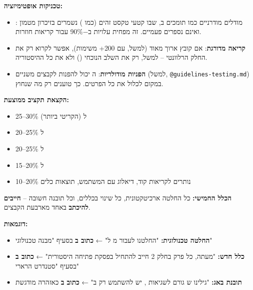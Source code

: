 \textbf{טכניקות אופטימיזציה:}
\begin{itemize}
  \item \textbf{}: מודלים מודרניים כמו  תומכים ב, שבו קטעי טקסט זהים (כמו ) נשמרים בזיכרון מטמון ואינם נספרים פעמיים. זה מפחית עלויות ב\num{-90}\% עבור קריאות חוזרות.
  \item \textbf{קריאה מדורגת}: אם קובץ ארוך מאוד (למשל,  עם \num{200}+ משימות), אפשר לקרוא רק את החלק הרלוונטי – למשל, רק את השלב הנוכחי () ולא את כל ההיסטוריה.
  \item \textbf{הפניות מודולריות}: ה יכול להפנות לקבצים משניים (למשל, \texttt{@guidelines-testing.md}) במקום לכלול את כל הפרטים. כך טוענים רק מה שנחוץ.
\end{itemize}

\textbf{הקצאת תקציב ממוצעת:}
\begin{itemize}
  \item \num{25}–\num{30}\% ל (הקריטי ביותר)
  \item \num{20}–\num{25}\% ל
  \item \num{20}–\num{25}\% ל
  \item \num{15}–\num{20}\% ל
  \item \num{10}–\num{20}\% נותרים לקריאות קוד, דיאלוג עם המשתמש, תוצאות כלים
\end{itemize}


\textbf{הכלל החמישי:} כל החלטה ארכיטקטונית, כל שינוי בכללים, וכל תובנה חשובה – \textbf{חייבים להיכתב} באחד מארבעת הקבצים.

\textbf{דוגמאות:}
\begin{itemize}
  \item \textbf{החלטה טכנולוגית:} "החלטנו לעבור מ ל" ← \textbf{כתוב ב} בסעיף "מבנה טכנולוגי"
  \item \textbf{כלל חדש:} "מעתה, כל פרק בחלק \num{2} חייב להתחיל בפסקת פתיחה היסטורית" ← \textbf{כתוב ב} בסעיף "סטנדרט הרארי"
  \item \textbf{תובנת באג:} "גילינו ש גורם לשגיאות , יש להשתמש רק ב" ← \textbf{כתוב ב} כאזהרה מודגשת
\end{itemize}

